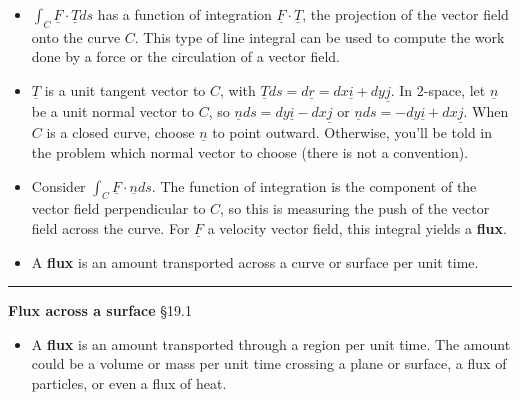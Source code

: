 \documentclass[12pt,letterpaper,noanswers]{exam}
\newcommand{\mb}[1]{\underline{#1}}
\begin{document}
\begin{tcolorbox}
\begin{itemize}
\itemsep0em
    \item $\displaystyle\int_C \mb F\cdot \mb T ds$ has a function of integration $\mb F \cdot \mb T$, the projection of the vector field onto the curve $C$.  This type of line integral can be used to compute the work done by a force or the circulation of a vector field.
    \item $\mb T$ is a unit tangent vector to $C$, with $\mb T ds = d\mb r = dx\mb i + dy\mb j$.  In $2$-space, let $\mb n$ be a unit normal vector to $C$, so $\mb n ds = dy\mb i - dx\mb j$ or $\mb n ds = -dy\mb i + dx\mb j$.  When $C$ is a closed curve, choose $\mb n$ to point outward.  Otherwise, you'll be told in the problem which normal vector to choose (there is not a convention).
    \item Consider $\displaystyle \int_C \mb F\cdot \mb n ds$.  The function of integration is the component of the vector field perpendicular to $C$, so this is measuring the push of the vector field across the curve.  For $\mb F$ a velocity vector field, this integral yields a \textbf{flux}.
    \item A \textbf{flux} is an amount transported across a curve or surface per unit time.
\end{itemize}
\end{tcolorbox}

\vspace{0.2cm}
\hrule
\vspace{0.2cm}

\noindent\textbf{Flux across a surface} \S 19.1



\begin{tcolorbox}
\begin{itemize}
\itemsep0em
    \item A \textbf{flux} is an amount transported through a region per unit time.  The amount could be a volume or mass per unit time crossing a plane or surface, a flux of particles, or even a flux of heat.
\end{itemize}


\end{tcolorbox}
\end{document}
